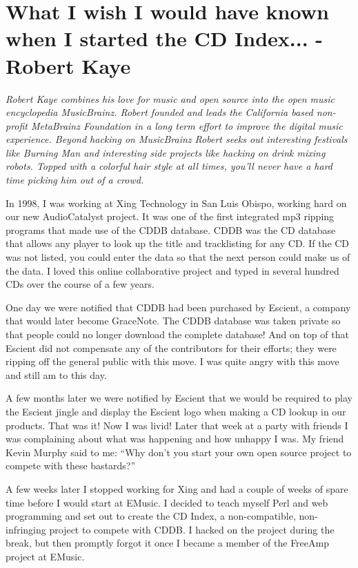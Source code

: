 \chapter{What I wish I would have known when I started the CD Index... - Robert
Kaye}

\textit{Robert Kaye combines his love for music and open source into the open
music encyclopedia MusicBrainz. Robert founded and leads the California based
non-profit MetaBrainz Foundation in a long term effort to improve the digital
music experience. Beyond hacking on MusicBrainz Robert seeks out interesting
festivals like Burning Man and interesting side projects like hacking on drink
mixing robots. Topped with a colorful hair style at all times, you'll never
have a hard time picking him out of a crowd.}

In 1998, I was working at Xing Technology in San Luis Obispo, working hard on
our new AudioCatalyst project. It was one of the first integrated mp3 ripping
programs that made use of the CDDB database. CDDB was the CD database that
allows any player to look up the title and tracklisting for any CD. If the CD
was not listed, you could enter the data so that the next person could make us
of the data. I loved this online collaborative project and typed in several
hundred CDs over the course of a few years.

One day we were notified that CDDB had been purchased by Escient, a company that
would later become GraceNote. The CDDB database was taken private so that people
could no longer download the complete database! And on top of that Escient did
not compensate any of the contributors for their efforts; they were ripping off
the general public with this move. I was quite angry with this move and still am
to this day.

A few months later we were notified by Escient that we would be required to play
the Escient jingle and display the Escient logo when making a CD lookup in our
products. That was it! Now I was livid! Later that week at a party with friends
I was complaining about what was happening and how unhappy I was. My friend
Kevin Murphy said to me: ``Why don’t you start your own open source project to
compete with these bastards?''

A few weeks later I stopped working for Xing and had a couple of weeks of spare
time before I would start at EMusic. I decided to teach myself Perl and web
programming and set out to create the CD Index, a non-compatible, non-infringing
project to compete with CDDB. I hacked on the project during the break, but then
promptly forgot it once I became a member of the FreeAmp project at EMusic.

